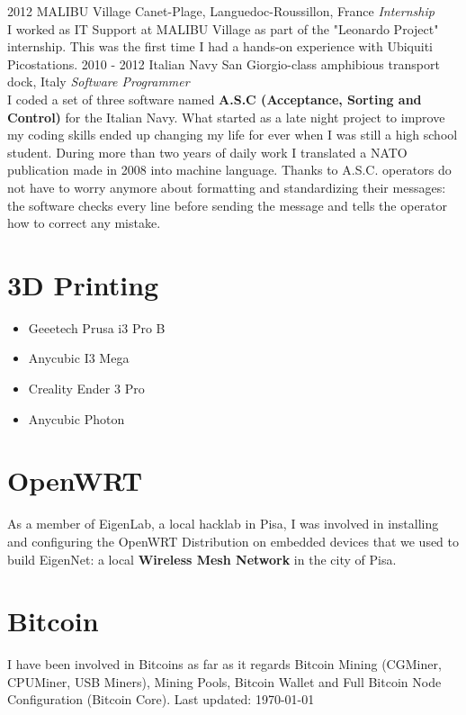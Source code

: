 \documentclass[]{friggeri-cv}
\begin{document}
\begin{entrylist}
\entry
{2012}
{MALIBU Village}
{Canet-Plage, Languedoc-Roussillon, France}
{\emph{Internship} \\
I worked as IT Support at MALIBU Village as part of the "Leonardo Project" internship. This was the first time I had a hands-on experience with Ubiquiti Picostations.}
\entry
{2010 - 2012}
{Italian Navy}
{San Giorgio-class amphibious transport dock, Italy}
{\emph{Software Programmer} \\
I coded a set of three software named \textbf{A.S.C (Acceptance, Sorting and Control)} for the Italian Navy. What started as a late night project to improve my coding skills ended up changing my life for ever when I was still a high school student. During more than two years of daily work I translated a NATO publication made in 2008 into machine language. Thanks to A.S.C. operators do not have to worry anymore about formatting and standardizing their messages: the software checks every line before sending the message and tells the operator how to correct any mistake.}
\end{entrylist}
\newpage


\begin{aside}\vspace{-2.8cm}
\section{3D Printing \textcolor{red}{\faConnectdevelop}}
\begin{itemize}
	\item Geeetech Prusa i3 Pro B
	\item Anycubic I3 Mega
	\item Creality Ender 3 Pro
	\item Anycubic Photon
\end{itemize}\vspace{6mm}
\section{OpenWRT \textcolor{green}{\faWifi}}
As a member of EigenLab, a local hacklab in Pisa, I was involved in installing and configuring the OpenWRT Distribution on embedded devices that we used to build EigenNet: a local \textbf{Wireless Mesh Network} in the city of Pisa.\vspace{6mm}
\section{Bitcoin \textcolor{red}{\faBitcoin}}
I have been involved in Bitcoins as far as it regards Bitcoin Mining (CGMiner, CPUMiner, USB Miners), Mining Pools, Bitcoin Wallet and Full Bitcoin Node Configuration (Bitcoin Core).\vspace{6mm}
\small{Last updated: \today\ }
\end{aside}
\end{document}
